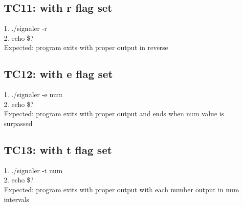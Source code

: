 \documentclass{article}
\begin{document}
\subsection*{TC11: with r flag set}
1. ./signaler -r\\
2. echo \$?\\
Expected: program exits with proper output in reverse\\
\subsection*{TC12: with e flag set}
1. ./signaler -e num\\
2. echo \$?\\
Expected: program exits with proper output and ends when num value is surpassed\\
\subsection*{TC13: with t flag set}
1. ./signaler -t num\\
2. echo \$?\\
Expected: program exits with proper output with each number output in num intervals\\
\\
\end{document}
